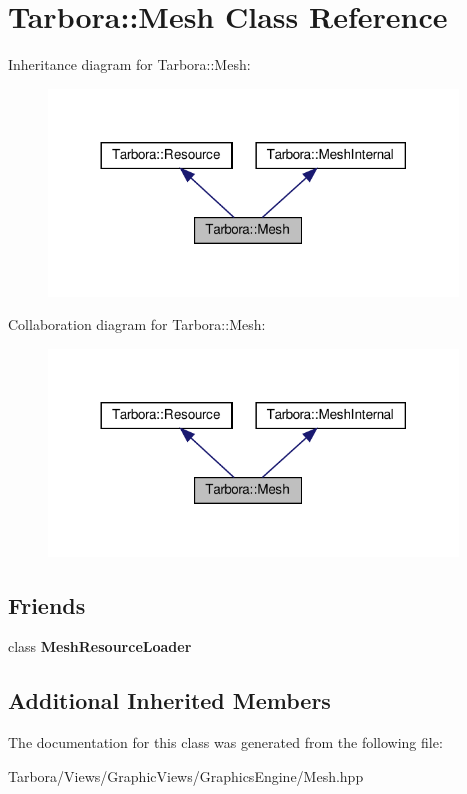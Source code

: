 \hypertarget{classTarbora_1_1Mesh}{}\section{Tarbora\+:\+:Mesh Class Reference}
\label{classTarbora_1_1Mesh}


Inheritance diagram for Tarbora\+:\+:Mesh\+:\nopagebreak
\begin{figure}[H]
\begin{center}
\leavevmode
\includegraphics[width=308pt]{classTarbora_1_1Mesh__inherit__graph}
\end{center}
\end{figure}


Collaboration diagram for Tarbora\+:\+:Mesh\+:\nopagebreak
\begin{figure}[H]
\begin{center}
\leavevmode
\includegraphics[width=308pt]{classTarbora_1_1Mesh__coll__graph}
\end{center}
\end{figure}
\subsection*{Friends}
\begin{DoxyCompactItemize}
\item 
\mbox{\label{classTarbora_1_1Mesh_a27c9226be711b1d4d1e81ab76c541bf2}} 
class {\bfseries Mesh\+Resource\+Loader}
\end{DoxyCompactItemize}
\subsection*{Additional Inherited Members}


The documentation for this class was generated from the following file\+:\begin{DoxyCompactItemize}
\item 
Tarbora/\+Views/\+Graphic\+Views/\+Graphics\+Engine/Mesh.\+hpp\end{DoxyCompactItemize}
